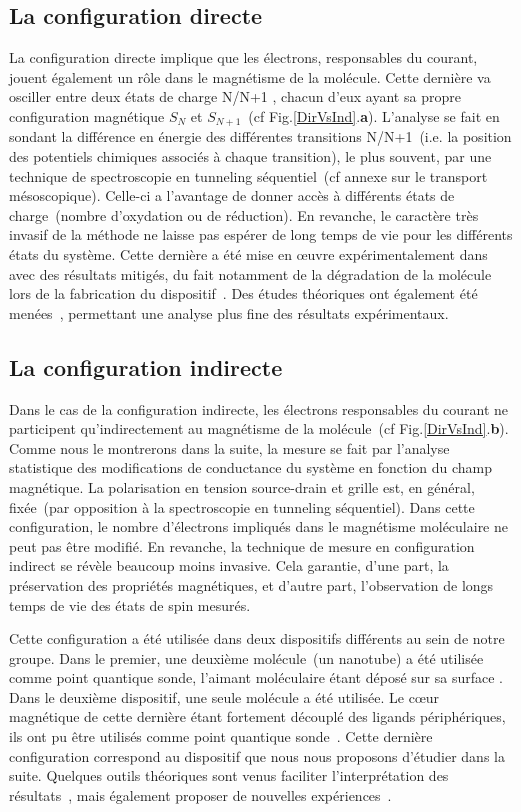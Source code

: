 \subsection{La configuration directe}
La configuration directe implique que les électrons, responsables du courant, jouent également un rôle dans le magnétisme de la molécule. Cette dernière va osciller entre deux états de charge N/N+1 , chacun d'eux ayant sa propre configuration magnétique $S_N$ et $S_{N+1}$~(cf Fig.\ref{DirVsInd}.\textbf{a}). L'analyse se fait en sondant la différence en énergie des différentes transitions N/N+1~(i.e. la position des potentiels chimiques associés à chaque transition), le plus souvent, par une technique de spectroscopie en tunneling séquentiel~(cf annexe sur le transport mésoscopique). Celle-ci a l'avantage de donner accès à différents états de charge~(nombre d'oxydation ou de réduction). En revanche, le caractère très invasif de la méthode ne laisse pas espérer de long temps de vie pour les différents états du système. Cette dernière a été mise en œuvre expérimentalement dans \cite{Heersche2006,Jo2006,Zyazin2010} avec des résultats mitigés, du fait notamment de la dégradation de la molécule lors de la fabrication du dispositif~\cite{Jo2006}. Des études théoriques ont également été menées~\cite{Timm2006,Timm2007}, permettant une analyse plus fine des résultats expérimentaux.

\subsection{La configuration indirecte}

Dans le cas de la configuration indirecte, les électrons responsables du courant ne participent qu'indirectement au magnétisme de la molécule~(cf Fig.\ref{DirVsInd}.\textbf{b}). Comme nous le montrerons dans la suite, la mesure se fait par l'analyse statistique des modifications de conductance du système en fonction du champ magnétique. La polarisation en tension source-drain et grille est, en général, fixée~(par opposition à la spectroscopie en tunneling séquentiel). Dans cette configuration, le nombre d'électrons impliqués dans le magnétisme moléculaire ne peut pas être modifié. En revanche, la technique de mesure en configuration indirect se révèle beaucoup moins invasive. Cela garantie, d'une part, la préservation des propriétés magnétiques, et d'autre part, l'observation de longs temps de vie des états de spin mesurés. 

Cette configuration a été utilisée dans deux dispositifs différents au sein de notre groupe. Dans le premier, une deuxième molécule~(un nanotube) a été utilisée comme point quantique sonde, l'aimant moléculaire étant déposé sur sa surface \cite{Urdampilleta2011}. Dans le deuxième dispositif, une seule molécule a été utilisée. Le cœur magnétique de cette dernière étant fortement découplé des ligands périphériques, ils ont pu être utilisés comme point quantique sonde~\cite{Vincent2012}. Cette dernière configuration correspond au dispositif que nous nous proposons d'étudier dans la suite. Quelques outils théoriques sont venus faciliter l'interprétation des résultats~\cite{Hong2012}, mais également proposer de nouvelles expériences~\cite{Jaafar2010,RostamzadehRenani2011}.


